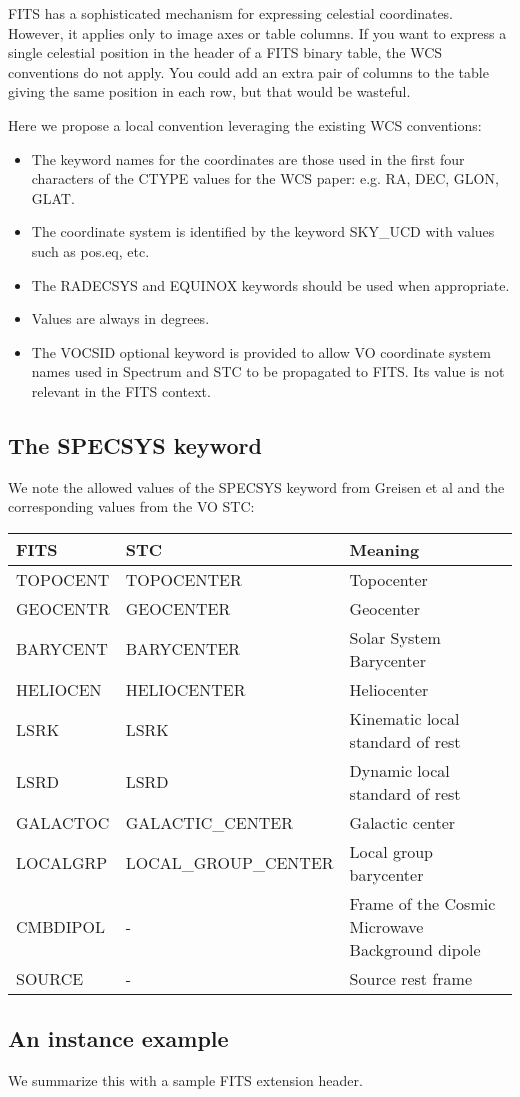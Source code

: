 FITS has a sophisticated mechanism for expressing celestial
coordinates. However, it applies only to image axes or table
columns. If you want to express a single celestial position in the
header of a FITS binary table, the WCS conventions do not apply.
You could add an extra pair of columns to the table giving the
same position in each row, but that would be wasteful.

Here we propose a local convention leveraging the existing
WCS conventions:
\begin{itemize}
\item The keyword names for the coordinates are those used
in the first four characters of the CTYPE values for the WCS paper:
e.g. RA, DEC, GLON, GLAT.
\item The coordinate system is identified by the keyword SKY\_UCD with
values such as pos.eq, etc.
\item The RADECSYS and EQUINOX keywords should be used when appropriate.
\item Values are always in degrees.
\item The VOCSID optional keyword is provided to allow VO coordinate
system names used in Spectrum and STC to be propagated to FITS.
Its value is not relevant in the FITS context.
\end{itemize}



\subsection{The SPECSYS keyword}

We note the allowed values of the SPECSYS keyword from
Greisen et al and the corresponding values from the VO STC:

\vskip 0.1in

\colorbox{iblue}{
\begin{tabular}{lll}
\hline
FITS   & STC   & Meaning\\
\hline
TOPOCENT &TOPOCENTER & Topocenter\\
GEOCENTR &GEOCENTER & Geocenter\\
BARYCENT &BARYCENTER & Solar System Barycenter\\
HELIOCEN &HELIOCENTER & Heliocenter\\
LSRK     &LSRK & Kinematic local standard of rest\\
LSRD     &LSRD & Dynamic local standard of rest\\
GALACTOC &GALACTIC\_CENTER & Galactic center\\
LOCALGRP &LOCAL\_GROUP\_CENTER & Local group barycenter\\
CMBDIPOL &- & Frame of the Cosmic Microwave Background dipole\\
SOURCE   &- & Source rest frame \\
\hline
\end{tabular}
}

\clearpage

\subsection{An instance example}


We summarize this with a sample FITS extension header.


